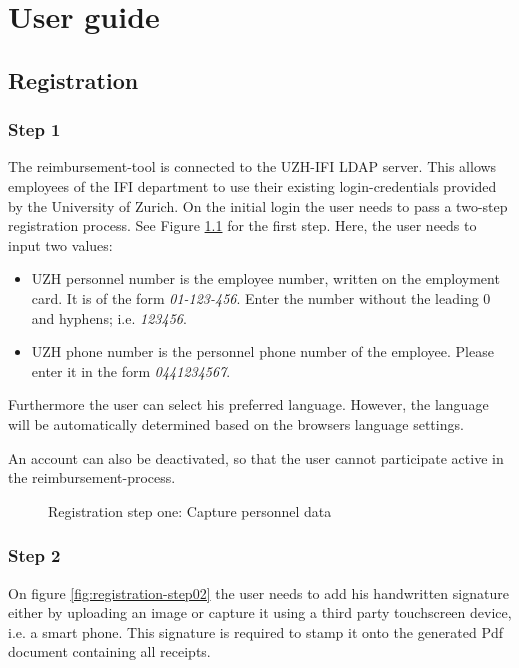 \chapter{User guide}

\section{Registration}
\label{sec:registration}

\subsection{Step 1}
The reimbursement-tool is connected to the UZH-IFI LDAP server. This allows employees of the IFI department to use their existing login-credentials provided by the University of Zurich.\newline
On the initial login the user needs to pass a two-step registration process. See Figure \ref{fig:registration-step01} for the first step. Here, the user needs to input two values:
\begin{itemize}
    \item UZH personnel number is the employee number, written on the employment card. It is of the form \textit{01-123-456}. Enter the number without the leading 0 and hyphens; i.e. \textit{123456}.
    \item UZH phone number is the personnel phone number of the employee. Please enter it in the form \textit{0441234567}.
\end{itemize}\newpage

Furthermore the user can select his preferred language. However, the language will be automatically determined based on the browsers language settings.\par
An account can also be deactivated, so that the user cannot participate active in the reimbursement-process.  

\begin{figure}[H]
    \centering
    \caption{Registration step one: Capture personnel data}
    \label{fig:registration-step01}
\end{figure}

\subsection{Step 2}
On figure \ref{fig:registration-step02} the user needs to add his handwritten signature either by uploading an image or capture it using a third party touchscreen device, i.e. a smart phone. This signature is required to stamp it onto the generated Pdf document containing all receipts.

